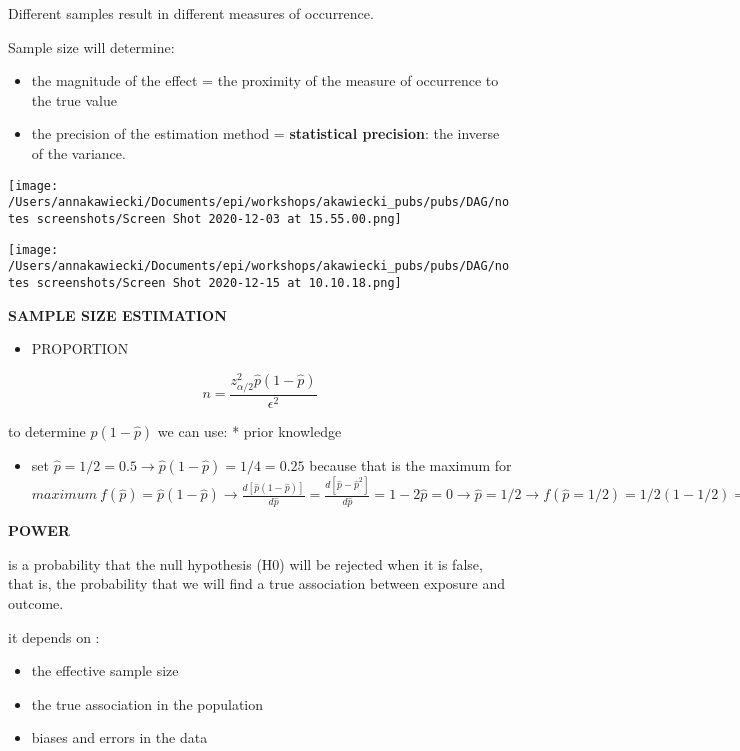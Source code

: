 \documentclass[
]{article}
\providecommand{\tightlist}{%
  \setlength{\itemsep}{0pt}\setlength{\parskip}{0pt}}
\begin{document}
Different samples result in different measures of occurrence.

Sample size will determine:

\begin{itemize}
\item
  the magnitude of the effect = the proximity of the measure of
  occurrence to the true value
\item
  the precision of the estimation method = \textbf{statistical
  precision}: the inverse of the variance.
\end{itemize}

\texttt{[image: /Users/annakawiecki/Documents/epi/workshops/akawiecki\_pubs/pubs/DAG/notes screenshots/Screen Shot 2020-12-03 at 15.55.00.png]}

\texttt{[image: /Users/annakawiecki/Documents/epi/workshops/akawiecki\_pubs/pubs/DAG/notes screenshots/Screen Shot 2020-12-15 at 10.10.18.png]}

\textbf{SAMPLE SIZE ESTIMATION}

\begin{itemize}
\tightlist
\item
  PROPORTION
\end{itemize}

\[n= \frac{z^2_{\alpha/2}\hat{p}(1-\hat{p})}{\epsilon^2}\]

to determine \(\hat{p}(1-\hat{p})\) we can use: * prior knowledge

\begin{itemize}
\tightlist
\item
  set \(\hat{p}=1/2= 0.5 \to \hat{p}(1-\hat{p}) = 1/4 = 0.25\) because
  that is the maximum for
  \(maximum\:f(\hat{p})=\hat{p}(1-\hat{p}) \to \frac{d[\hat{p}(1-\hat{p})]}{d\hat{p}}= \frac{d[\hat{p}-\hat{p}^2]}{d\hat{p}} = 1-2\hat{p}= 0 \to \hat{p}= 1/2 \to f(\hat{p}= 1/2)=1/2(1-1/2)= 1/4\)
\end{itemize}

\textbf{POWER}

is a probability that the null hypothesis (H0) will be rejected when it
is false, that is, the probability that we will find a true association
between exposure and outcome.

it depends on :

\begin{itemize}
\tightlist
\item
  the effective sample size
\item
  the true association in the population
\item
  biases and errors in the data
\end{itemize}
\end{document}
